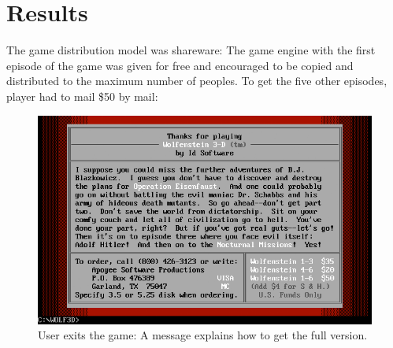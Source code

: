 \documentclass[book.tex]{subfiles}
\begin{document}
\section{Results}
The game distribution model was shareware: The game engine with the first episode of the game was given for free and encouraged to be copied and distributed to the maximum number of peoples. To get the five other episodes, player had to mail \$50 by mail:\\
\par
\begin{figure}[H]
\centering
 \includegraphics[width=\textwidth]{imgs/shareware.png}
 \caption{User exits the game: A message explains how to get the full version.}
 \end{figure}
\end{document}
